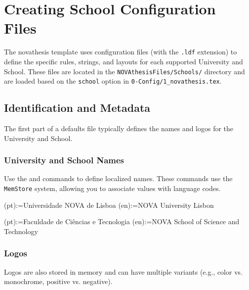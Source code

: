 
%

\chapter{Creating School Configuration Files}
\label{cha:defaults_files}

The \gls{novathesis} template uses configuration files (with the \texttt{.ldf} extension) to define the specific rules, strings, and layouts for each supported University and School. These files are located in the \texttt{NOVAthesisFiles/Schools/} directory and are loaded based on the \texttt{school} option in \texttt{0-Config/1\_novathesis.tex}.

\section{Identification and Metadata}
\label{sec:identification}

The first part of a defaults file typically defines the names and logos for the University and School.

\subsection{University and School Names}
Use the \latexinline{\university} and \latexinline{\school} commands to define localized names. These commands use the \texttt{MemStore} system, allowing you to associate values with language codes.

\begin{ltx}
\university(pt):={Universidade NOVA de Lisboa}
\university(en):={NOVA University Lisbon}

\school(pt):={Faculdade de Ciências e Tecnologia}
\school(en):={NOVA School of Science and Technology}
\end{ltx}

\subsection{Logos}
Logos are also stored in memory and can have multiple variants (e.g., color vs. monochrome, positive vs. negative).


